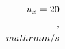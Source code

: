 \documentclass[preview]{standalone}
\begin{document}
\begin{align*}
\special{dvisvgm:raw <g id='unique000'>}u_x = 20\\,\\mathrm{m/s}\special{dvisvgm:raw </g>}
\end{align*}
\end{document}
